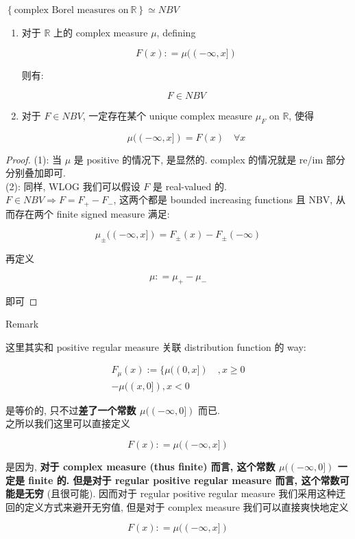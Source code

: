 \documentclass{qlnotes-export}
\begin{document}
\begin{theorem}{\protect{}\label{kn-text-complex-borel-measures-on-mathbb-r-simeq-nbv}{\textbf{\(\left\{ {\text{complex Borel measures on}\ {\mathbb{R}}} \right\} \simeq NBV\)}}}

\begin{enumerate}
\item
  对于 \(\mathbb{R}\) 上的 complex measure \(\mu\), defining

  \[F(x): = \mu(( - \infty,x\rbrack)\]

  则有:

  \[F \in NBV\]
\item
  对于 \(F \in NBV\), 一定存在某个 unique complex measure \(\mu_{F}\) on \(\mathbb{R}\), 使得

  \[\mu(( - \infty,x\rbrack) = F(x)\quad\forall x\]
\end{enumerate}

\end{theorem}

\begin{proof}

(1): 当 \(\mu\) 是 positive 的情况下, 是显然的. complex 的情况就是 re/im 部分分别叠加即可.\\
(2): 同样, WLOG 我们可以假设 \(F\) 是 real-valued 的.\\
\(F \in NBV\Longrightarrow F = F_{+} - F_{-}\), 这两个都是 bounded increasing functions 且 NBV, 从而存在两个 finite signed measure 满足:

\[\mu_{\pm}(( - \infty,x\rbrack) = F_{\pm}(x) - F_{\pm}( - \infty)\]

再定义

\[\mu: = \mu_{+} - \mu_{-}\]

即可

\end{proof}

\begin{qlremark}{Remark}

这里其实和 positive regular measure 关联 distribution function 的 way:

\[\begin{matrix}
{F_{\mu}(x) := \{\mu((0,x\rbrack)\quad,x \geq 0} \\
{- \mu((x,0\rbrack),x < 0}
\end{matrix}\]

是等价的, 只不过\textbf{差了一个常数 \(\mu(( - \infty,0\rbrack)\)} 而已.\\
之所以我们这里可以直接定义

\[F(x): = \mu(( - \infty,x\rbrack)\]

是因为, \textbf{对于 complex measure (thus finite) 而言, 这个常数 \(\mu(( - \infty,0\rbrack)\) 一定是 finite 的. 但是对于 regular positive regular measure 而言, 这个常数可能是无穷} (且很可能). 因而对于 regular positive regular measure 我们采用这种迂回的定义方式来避开无穷值, 但是对于 complex measure 我们可以直接爽快地定义

\[F(x): = \mu(( - \infty,x\rbrack)\]

\end{qlremark}
\end{document}
